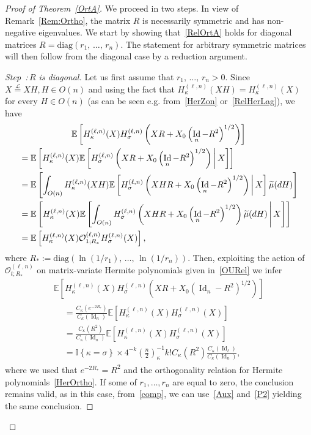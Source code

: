 \documentclass[AHL,Unicode,longabstracts,published]{cedram}
\DeclareMathOperator{\Id}{Id}
\newcommand{\diag}{\mathrm{diag}}
\newcommand{\clO}{\mathcal{O}}
\newcommand{\E}[1]{\mathbb{E}\left[#1\right]}
\newcommand{\eqLaw}{ \overset{\mathcal{L}}{=} }
\newcommand{\ind}[1]{\mathbb{I}
\left\{#1\right\}}
\newcounter{stepcount}
\newenvironment{step}[1]{\refstepcounter{stepcount}\begin{proof}[{Step~\thestepcount:\,}{#1}]}{\let\qed\relax\end{proof}}
\let\oldtilde\tilde
\renewcommand*{\tilde}[1]{\mathchoice{\widetilde{#1}}{\widetilde{#1}}{\oldtilde{#1}}{\oldtilde{#1}}}
\begin{document}
\begin{proof}[Proof of Theorem~\ref{OrtA}]
We proceed in two steps. In view of Remark~\ref{Rem:Ortho}, the matrix $R$ is necessarily symmetric and has non-negative eigenvalues. We start by showing that~\eqref{RelOrtA} holds for diagonal matrices $R=\diag(r_1,\,\ldots,\,r_n)$. The statement for arbitrary symmetric matrices will then follow from the diagonal case by a reduction argument.

\begin{step}{{$R$ is diagonal}}\label{Step1}
Let us first assume that $r_1,\,\ldots,\,r_n>0$. Since $X \eqLaw XH, H \in O(n)$ and using the fact that $H_{\kappa}^{(\ell,n)}(XH)=H_{\kappa}^{(\ell,n)}(X)$ for every $H \in O(n)$ (as can be seen e.g. from~\eqref{HerZon} or~\eqref{RelHerLag}), we have
\begin{multline}\label{comp}
\E{H_{\kappa}^{(\ell,n)}(X) H_{\sigma}^{(\ell,n)}\left(XR+X_0\left(\Id_n-R^2\right)^{1/2}\right)}\\
\begin{aligned}
&= \E{H_{\kappa}^{(\ell,n)}(X) \E{H_{\sigma}^{(\ell,n)}\left(XR+X_0\left(\Id_n-R^2\right)^{1/2}\right) \,\middle|\,X}}\\
&= \E{\int_{O(n)}H_{\kappa}^{(\ell,n)}(XH) \E{H_{\sigma}^{(\ell,n)}\left(XHR+X_0\left(\Id_n-R^2\right)^{1/2}\right) \,\middle|\,X}\tilde{\mu}(dH)}\\
&= \E{H_{\kappa}^{(\ell,n)}(X) \E{ \int_{O(n)}H_{\sigma}^{(\ell,n)}\left(XHR+X_0\left(\Id_n-R^2\right)^{1/2}\right) \tilde{\mu}(dH) \,\middle|\,X}}\\
&= \E{H_{\kappa}^{(\ell,n)}(X) \clO_{1;R_*}^{(\ell,n)}H_{\sigma}^{(\ell,n)}(X)},
\end{aligned}
\end{multline}
where $R_*:=\diag(\ln(1/r_1),\,\ldots,\,\ln(1/r_n))$. Then, exploiting the action of $\clO_{t;R_*}^{(\ell,n)}$ on matrix-variate Hermite polynomials given in~\eqref{OURel} we infer
\begin{multline*}
\E{H_{\kappa}^{(\ell,n)}(X) H_{\sigma}^{(\ell,n)}\left(XR+X_0\left(\Id_n-R^2\right)^{1/2}\right)}\\
\begin{aligned}
&= \frac{C_{\kappa}\left(e^{-2R_*}\right)}{C_{\kappa}(\Id_n)}\E{H_{\kappa}^{(\ell,n)}(X)H_{\sigma}^{(\ell,n)}(X)} \\
&= \frac{C_{\kappa}(R^2)}{C_{\kappa}(\Id_n)}\E{H_{\kappa}^{(\ell,n)}(X)H_{\sigma}^{(\ell,n)}(X)}\\
&=\ind{\kappa=\sigma}\times 4^{-k}\left(\frac{n}{2}\right)_{\kappa}^{-1} k ! C_{\kappa}(R^2)\frac{C_{\kappa}(\Id_{\ell})}{C_{\kappa}(\Id_n)},
\end{aligned}
\end{multline*}
where we used that $e^{-2R_*}=R^2$ and the orthogonality relation for Hermite polynomials~\eqref{HerOrtho}. If some of $r_1,\ldots,r_n$ are equal to zero, the conclusion remains valid, as in this case, from~\eqref{comp}, we can use~\eqref{Aux} and~\eqref{P2} yielding the same conclusion.
\end{step}


\end{proof}
\end{document}
